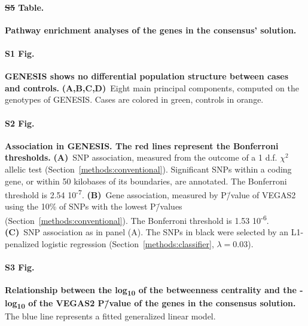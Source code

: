 \documentclass[10pt,letterpaper]{article}
\providecommand{\DIFaddtex}[1]{{\protect\color{blue}\uwave{#1}}} %
\providecommand{\DIFdeltex}[1]{{\protect\color{red}\sout{#1}}}                      %
\providecommand{\DIFaddbegin}{} %
\providecommand{\DIFaddend}{} %
\providecommand{\DIFdelbegin}{} %
\providecommand{\DIFdelend}{} %
\providecommand{\DIFadd}[1]{\texorpdfstring{\DIFaddtex{#1}}{#1}} %
\providecommand{\DIFdel}[1]{\texorpdfstring{\DIFdeltex{#1}}{}} %
\newcommand{\DIFscaledelfig}{0.5}
\newlength{\DIFdelgraphicswidth} %
\newlength{\DIFdelgraphicsheight} %
\newcommand{\DIFaddincludegraphics}[2][]{{\color{blue}\fbox{\DIFOincludegraphics[#1]{#2}}}} %
\newcommand{\DIFdelincludegraphics}[2][]{%
\sbox{\DIFdelgraphicsbox}{\DIFOincludegraphics[#1]{#2}}%
\settoboxwidth{\DIFdelgraphicswidth}{\DIFdelgraphicsbox} %
\settoboxtotalheight{\DIFdelgraphicsheight}{\DIFdelgraphicsbox} %
\scalebox{\DIFscaledelfig}{%
\parbox[b]{\DIFdelgraphicswidth}{\usebox{\DIFdelgraphicsbox}\\[-\baselineskip] \rule{\DIFdelgraphicswidth}{0em}}\llap{\resizebox{\DIFdelgraphicswidth}{\DIFdelgraphicsheight}{%
\setlength{\unitlength}{\DIFdelgraphicswidth}%
\begin{picture}(1,1)%
\thicklines\linethickness{2pt} %
{\color[rgb]{1,0,0}\put(0,0){\framebox(1,1){}}}%
{\color[rgb]{1,0,0}\put(0,0){\line( 1,1){1}}}%
{\color[rgb]{1,0,0}\put(0,1){\line(1,-1){1}}}%
\end{picture}%
}\hspace*{3pt}}} %
} %
\DeclareRobustCommand{\DIFaddbegin}{\DIFOaddbegin \let\includegraphics\DIFaddincludegraphics} %
\DeclareRobustCommand{\DIFaddend}{\DIFOaddend \let\includegraphics\DIFOincludegraphics} %
\DeclareRobustCommand{\DIFdelbegin}{\DIFOdelbegin \let\includegraphics\DIFdelincludegraphics} %
\DeclareRobustCommand{\DIFdelend}{\DIFOaddend \let\includegraphics\DIFOincludegraphics} %
\begin{document}
\paragraph*{\DIFdelbegin \DIFdel{S5 }\DIFdelend \DIFaddbegin \DIFadd{S7 }\DIFaddend Table.}
\label{stab:consensus_pwy}
\textbf{Pathway enrichment analyses of the genes in the consensus' solution.}

\paragraph*{S1 Fig.}
\label{sfig:pcs}
\textbf{GENESIS shows no differential population structure between cases and controls.} \textbf{(A,B,C,D)}~Eight main principal components, computed on the genotypes of GENESIS. Cases are colored in green, controls in orange.

\paragraph*{S2 Fig.}
\label{sfig:snp_gene_manhattan}
\textbf{Association in GENESIS. The red lines represent the Bonferroni thresholds.} \textbf{(A)}~SNP association, measured from the outcome of a 1 d.f. $\chi^2$ allelic test (Section~\ref{methods:conventional}). Significant SNPs within a coding gene, or within 50 kilobases of its boundaries, are annotated. The Bonferroni threshold is 2.54 \texttimes{} 10\textsuperscript{-7}. \textbf{(B)}~Gene association, measured by P\=/value of VEGAS2 \cite{mishra_vegas2:_2015} using the 10\% of SNPs with the lowest P\=/values (Section~\ref{methods:conventional}). The Bonferroni threshold is 1.53 \texttimes{} 10\textsuperscript{-6}. \textbf{(C)}~SNP association as in panel (A). The SNPs in black were selected by an L1-penalized logistic regression (Section~\ref{methods:classifier}, $\lambda = 0.03$).

\paragraph*{S3 Fig.}
\label{sfig:consensus_stats}
\textbf{Relationship between the log\textsubscript{10} of the betweenness centrality and the -log\textsubscript{10} of the VEGAS2 P\=/value of the genes in the consensus solution.} The blue line represents a fitted generalized linear model.
\end{document}
